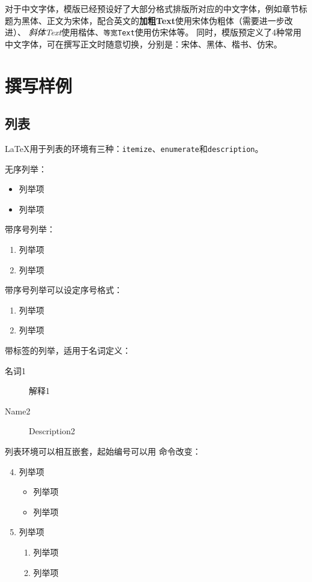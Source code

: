 对于中文字体，模版已经预设好了大部分格式排版所对应的中文字体，例如章节标题为黑体、正文为宋体，配合英文的\textbf{加粗Text}使用宋体伪粗体（需要进一步改进）、
\textit{斜体Text}使用楷体、\texttt{等宽Text}使用仿宋体等。
同时，模版预定义了4种常用中文字体，可在撰写正文时随意切换，分别是：{\songti 宋体}、{\heiti 黑体}、{\kaishu 楷书}、{\fangsong 仿宋}。

\section{撰写样例}\label{sec:samples}

\subsection{列表}
\LaTeX 用于列表的环境有三种：\texttt{itemize}、\texttt{enumerate}和\texttt{description}。

无序列举：
\begin{itemize}
	\item 列举项
	\item 列举项
\end{itemize}

带序号列举：
\begin{enumerate}
	\item 列举项
	\item 列举项
\end{enumerate}

带序号列举可以设定序号格式：
\begin{enumerate}[1).]
	\item 列举项
	\item 列举项
\end{enumerate}

带标签的列举，适用于名词定义：
\begin{description}
	\item[名词1] 解释1
	\item[Name2] Description2
\end{description}

列表环境可以相互嵌套，起始编号可以用  命令改变：
\begin{enumerate}
    \setcounter{enumi}{3}
	\item 列举项
    \begin{itemize}
    	\item 列举项
    	\item 列举项
    \end{itemize}
	\item 列举项
	\begin{enumerate}
    	\item 列举项
    	\item 列举项
	\end{enumerate}
\end{enumerate}


